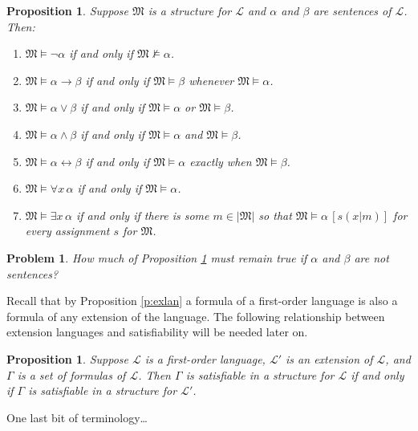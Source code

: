 \documentclass[12pt]{amsbook}
\newcommand{\nmodels}{\nvDash}
\newcommand{\fromto}{\leftrightarrow}
\theoremstyle{plain}
\newtheorem{prop}[thm]{Proposition}
\newtheorem{prob}[thm]{Problem}
\theoremstyle{definition}
\theoremstyle{remark}
\begin{document}
\begin{prop} \label{p:mif}
Suppose $\mathfrak{M}$ is a structure for $\mathcal{L}$ and $\alpha$ and $\beta$ are sentences of $\mathcal{L}$.  Then:
\begin{enumerate}
\item $\mathfrak{M} \models \lnot\alpha$ if and only if $\mathfrak{M} \nmodels \alpha$.
\item $\mathfrak{M} \models \alpha \to \beta$ if and only if $\mathfrak{M} \models \beta$ whenever $\mathfrak{M} \models \alpha$.
\item $\mathfrak{M} \models \alpha \lor \beta$ if and only if $\mathfrak{M} \models \alpha$ or $\mathfrak{M} \models \beta$.
\item $\mathfrak{M} \models \alpha \land \beta$ if and only if $\mathfrak{M} \models \alpha$ and $\mathfrak{M} \models \beta$.
\item $\mathfrak{M} \models \alpha \fromto \beta$ if and only if $\mathfrak{M} \models \alpha$ exactly when $\mathfrak{M} \models \beta$.
\item $\mathfrak{M} \models \forall x\, \alpha$ if and only if $\mathfrak{M} \models \alpha$.
\item $\mathfrak{M} \models \exists x\, \alpha$ if and only if there is some $m \in |\mathfrak{M}|$ so that $\mathfrak{M} \models \alpha\, [s(x|m)]$ for every assignment $s$ for $\mathfrak{M}$.
\end{enumerate}
\end{prop}

\begin{prob}  \label{p:mif2}
How much of Proposition \ref{p:mif} must remain true if $\alpha$ and $\beta$ are not sentences?
\end{prob}

Recall that by Proposition \ref{p:exlan} a formula of a first-order language is also a formula of any extension of the language.  The following relationship between extension languages and satisfiability will be needed later on.

\begin{prop} \label{p:exsat}
Suppose $\mathcal{L}$ is a first-order language,  $\mathcal{L}'$ is an extension of $\mathcal{L}$,  and $\Gamma$ is a set of formulas of $\mathcal{L}$.  Then $\Gamma$ is satisfiable in a structure for $\mathcal{L}$ if and only if $\Gamma$ is satisfiable in a structure for $\mathcal{L}'$.
\end{prop}

One last bit of terminology\dots
\end{document}
